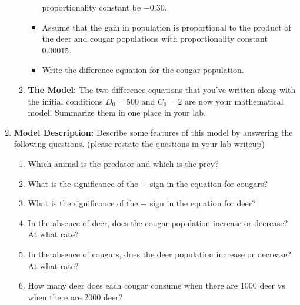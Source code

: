 \begin{problem}
\begin{enumerate}
\begin{enumerate}
\begin{itemize}
                        proportionality constant be $-0.30$.
                    \item Assume that the gain in population is proportional to the
                        product of the deer and cougar populations with proportionality
                        constant $0.00015$.
                    \item Write the difference equation for the cougar population.
                \end{itemize}
            \item {\bf The Model:} The two difference equations that you've written along
                with the initial conditions $D_0 = 500$ and $C_0 = 2$ are now your
                mathematical model!  Summarize them in one place in your lab.
        \end{enumerate}
    \item {\bf Model Description:} Describe some features of this model by answering the following questions.
        (please restate the questions in your lab writeup)
        \begin{enumerate}
            \item Which animal is the predator and which is the prey? 
            \item What is the significance of the $+$ sign in the equation for cougars? 
            \item What is the significance of the $-$ sign in the equation for deer? 
            \item In the absence of deer, does the cougar population increase or decrease?
                At what rate?
            \item In the absence of cougars, does the deer population increase or
                decrease? At what rate?
            \item How many deer does each cougar consume when there are 1000 deer vs when
                there are 2000 deer?
        \end{enumerate}


\end{enumerate}
\end{problem}
